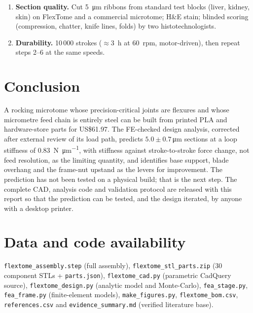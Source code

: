 \documentclass[11pt,a4paper]{article}
\begin{document}
\begin{enumerate}[nosep]
\item \textbf{Section quality.} Cut \SI{5}{\micro\metre} ribbons from standard test blocks (liver, kidney, skin) on FlexTome and a commercial microtome; H\&E stain; blinded scoring (compression, chatter, knife lines, folds) by two histotechnologists.
\item \textbf{Durability.} 10\,000 strokes ($\approx$\SI{3}{\hour} at 60~rpm, motor-driven), then repeat steps 2--6 at the same speeds.
\end{enumerate}

\FloatBarrier
\section{Conclusion}
A rocking microtome whose precision-critical joints are flexures and whose micrometre feed chain is entirely steel can be built from printed PLA and hardware-store parts for US\$61.97. The FE-checked design analysis, corrected after external review of its load path, predicts $5.0\pm0.7$\,\si{\micro\metre} sections at a loop stiffness of \SI{0.83}{\newton\per\micro\metre}, with stiffness against stroke-to-stroke force change, not feed resolution, as the limiting quantity, and identifies base support, blade overhang and the frame-nut upstand as the levers for improvement. The prediction has not been tested on a physical build; that is the next step. The complete CAD, analysis code and validation protocol are released with this report so that the prediction can be tested, and the design iterated, by anyone with a desktop printer.

\section*{Data and code availability}
\texttt{flextome\_assembly.step} (full assembly), \texttt{flextome\_stl\_parts.zip} (30 component STLs + \texttt{parts.json}), \texttt{flextome\_cad.py} (parametric CadQuery source), \texttt{flextome\_design.py} (analytic model and Monte-Carlo), \texttt{fea\_stage.py}, \texttt{fea\_frame.py} (finite-element models), \texttt{make\_figures.py}, \texttt{flextome\_bom.csv}, \texttt{references.csv} and \texttt{evidence\_summary.md} (verified literature base).



\end{document}
